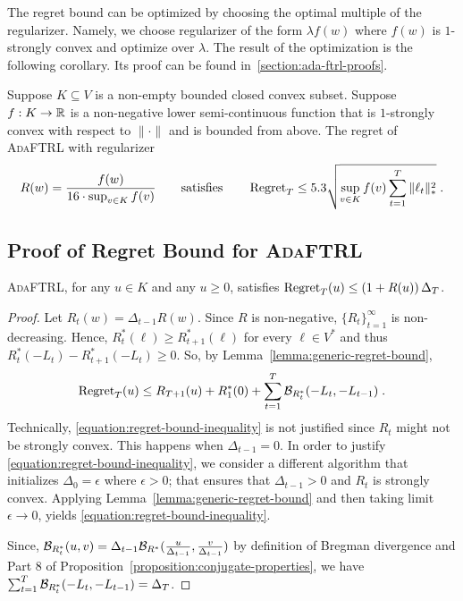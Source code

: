 The regret bound can be optimized by choosing the optimal multiple of the
regularizer.  Namely, we choose regularizer of the form $\lambda f(w)$ where
$f(w)$ is $1$-strongly convex and optimize over $\lambda$. The result of the
optimization is the following corollary.  Its proof can be found in~\ref{section:ada-ftrl-proofs}.

\begin{corollary}
\label{corollary:ada-ftrl-regret-bound}
Suppose $K \subseteq V$ is a non-empty bounded closed convex subset. Suppose
$f:K \to \mathbb{R}$ is a non-negative lower semi-continuous function that is
$1$-strongly convex with respect to $\|\cdot\|$ and is bounded from above.  The
regret of \textsc{AdaFTRL} with regularizer
$$
R(w) = \frac{f(w)}{16 \cdot \sup_{v \in K} f(v)}
\qquad \text{satisfies} \qquad
\operatorname{Regret}_T \le
5.3 \sqrt{\sup_{v \in K} f(v) \sum_{t=1}^T \|\ell_t\|_*^2} \; .
$$
\end{corollary}

\subsection{Proof of Regret Bound for \textsc{AdaFTRL}}
\label{section:ada-ftrl-regret-bound}

\begin{lemma}
\label{lemma:initial-regret-bound}
\textsc{AdaFTRL}, for any $u \in K$ and any $u \ge 0$, satisfies
$\operatorname{Regret}_T(u) \le \left(1 + R(u) \right) \Delta_T$.
\end{lemma}

\begin{proof}
Let $R_t(w) = \Delta_{t-1} R(w)$. Since $R$ is non-negative,
$\{R_t\}_{t=1}^\infty$ is non-decreasing.  Hence, $R_t^*(\ell) \ge
R_{t+1}^*(\ell)$ for every $\ell \in V^*$ and thus $R_t^*(-L_t) -
R_{t+1}^*(-L_t) \ge 0$.  So, by Lemma~\ref{lemma:generic-regret-bound},
\begin{equation}
\label{equation:regret-bound-inequality}
\operatorname{Regret}_T(u) \le R_{T+1}(u) + R_1^*(0) + \sum_{t=1}^{T} \mathcal{B}_{R_t^*}(-L_t, -L_{t-1}) \; .
\end{equation}
Technically, \eqref{equation:regret-bound-inequality} is not justified since $R_t$
might not be strongly convex. This happens when $\Delta_{t-1} = 0$. In order to justify
\eqref{equation:regret-bound-inequality}, we consider a different algorithm
that initializes $\Delta_0 = \epsilon$ where $\epsilon > 0$; that ensures that $\Delta_{t-1} > 0$ and $R_t$ is strongly convex.
Applying  Lemma~\ref{lemma:generic-regret-bound} and then taking limit $\epsilon \to 0$,
yields \eqref{equation:regret-bound-inequality}.

Since, $\mathcal{B}_{R_t^*}(u,v) = \Delta_{t-1} \mathcal{B}_{R^*}(\frac{u}{\Delta_{t-1}},
\frac{v}{\Delta_{t-1}})$ by definition of Bregman divergence and Part 8 of
Proposition~\ref{proposition:conjugate-properties}, we have $\sum_{t=1}^T
\mathcal{B}_{R_t^*}(-L_t, -L_{t-1}) = \Delta_T$.
\end{proof}

